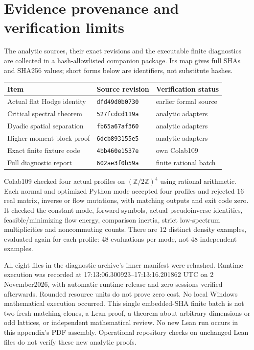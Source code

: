 \documentclass[11pt]{article}
\begin{document}
\section{Evidence provenance and verification limits}\label{sec:evidence}
The analytic sources, their exact revisions and the executable finite diagnostics are
collected in a hash-allowlisted companion package. Its map gives full SHAs and SHA256
values; short forms below are identifiers, not substitute hashes.
\begin{center}\small
\begin{tabular}{lll}
Item & Source revision & Verification status\\\hline
Actual flat Hodge identity & \texttt{dfd49d0b0730} & earlier formal source\\
Critical spectral theorem & \texttt{527fcdcd119a} & analytic adapters\\
Dyadic spatial separation & \texttt{fb65a67af360} & analytic adapters\\
Higher moment block proof & \texttt{6dcb893155e5} & analytic adapters\\
Exact finite fixture code & \texttt{4bb460e1537e} & own Colab109\\
Full diagnostic report & \texttt{602ae3f0b59a} & finite rational batch
\end{tabular}
\end{center}
Colab109 checked four actual profiles on $(\mathbb Z/2\mathbb Z)^4$ using rational
arithmetic. Each normal and optimized Python mode accepted four profiles and rejected
16 real matrix, inverse or flow mutations, with matching outputs and exit code zero.
It checked the constant mode, forward symbols, actual pseudoinverse identities,
feasible/minimizing flow energy, comparison inertia, strict low-spectrum multiplicities
and noncommuting counts. There are 12 distinct density examples, evaluated again for
each profile: 48 evaluations per mode, not 48 independent examples.

All eight files in the diagnostic archive's inner manifest were rehashed. Runtime
execution was recorded at 17:13:06.300923--17:13:16.201862 UTC on 2 November2026,
with automatic runtime release and zero sessions verified afterwards. Rounded resource
units do not prove zero cost. No local Windows mathematical execution occurred.
This single embedded-SHA finite batch is not two fresh matching clones, a Lean proof,
a theorem about arbitrary dimensions or odd lattices, or independent mathematical review.
No new Lean run occurs in this appendix's PDF assembly. Operational repository checks
on unchanged Lean files do not verify these new analytic proofs.
\end{document}
